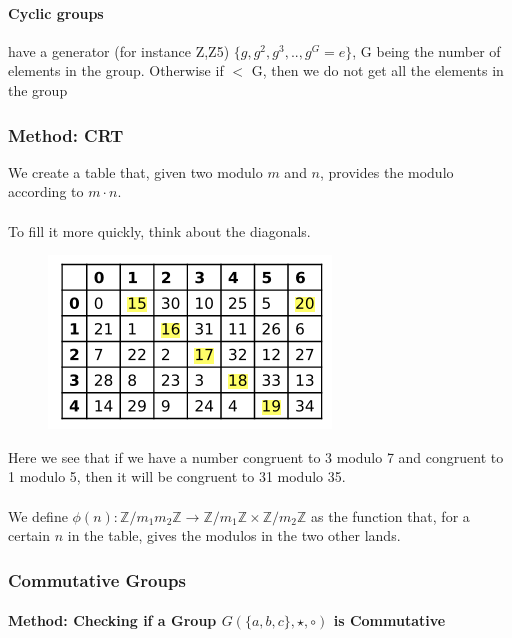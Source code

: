 \documentclass{article}
\begin{document}
\paragraph{Cyclic groups} have a generator (for instance Z,Z5)
$\{ g, g^2, g^3, .., g^G = e \}$, G being the number of elements in the group. Otherwise if $ < $ G, then we do not get all the elements in the group

\subsubsection{Method: CRT}

We create a table that, given two modulo \( m \) and \( n \), provides the modulo according to \( m \cdot n \).\\\\
To fill it more quickly, think about the diagonals.

\begin{figure}[h]
    \centering
    \includegraphics[width=0.5\linewidth]{crt.png}
    \label{fig:enter-label}
\end{figure}

Here we see that if we have a number congruent to 3 modulo 7 and congruent to 1 modulo 5, then it will be congruent to 31 modulo 35.\\\\
We define \(\phi(n) : \mathbb{Z}/m_1m_2\mathbb{Z} \rightarrow \mathbb{Z}/m_1\mathbb{Z} \times \mathbb{Z}/m_2\mathbb{Z}\) as the function that, for a certain \( n \) in the table, gives the modulos in the two other lands.

\subsubsection{Commutative Groups}

\paragraph{Method: Checking if a Group \( G(\{a, b, c\}, \star, \circ) \) is Commutative}
\end{document}
